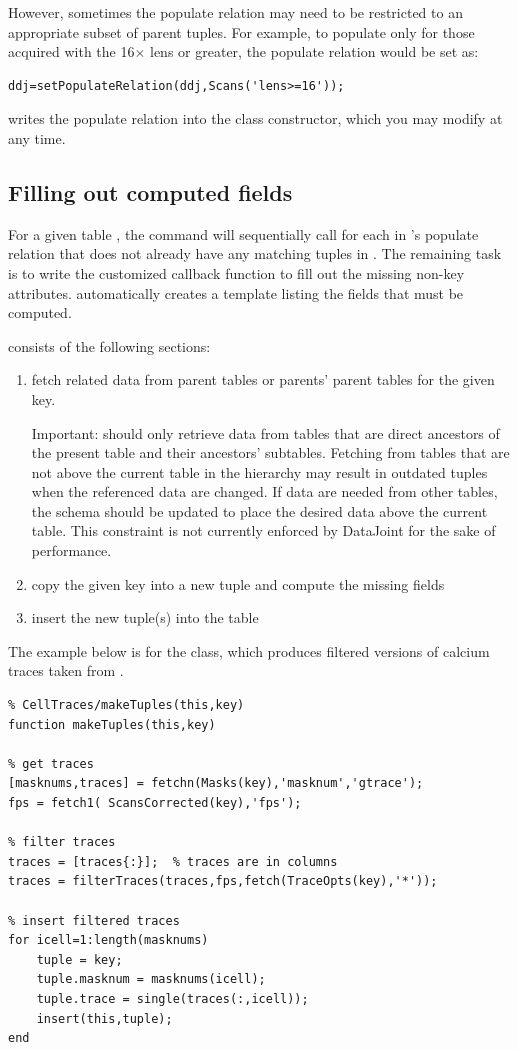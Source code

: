 \documentclass[10pt]{article}
\begin{document}
However, sometimes the populate relation may need to be restricted to an appropriate subset of parent tuples. For example, to populate  only for those  acquired with the 16$\times$ lens or greater, the populate relation would be set as:
\begin{lstlisting}
ddj=setPopulateRelation(ddj,Scans('lens>=16'));
\end{lstlisting}

 writes the populate relation into the class constructor, which you may modify at any time.

\subsection{Filling out computed fields}
For a given table , the command   will sequentially call  for each  in 's populate relation that does not already have any matching tuples in .  The remaining task is to write the customized  callback function to fill out the missing non-key attributes.  automatically creates a template  listing the fields that must be computed. 

 consists of the following sections:
\begin{enumerate}
\item fetch related data from parent tables or parents' parent tables for the given key.  

{\color{red}Important:}  should only retrieve data from tables that are direct ancestors of the present table and their ancestors' subtables. Fetching from tables that are not above the current table in the hierarchy may result in outdated tuples when the referenced data are changed. If data are needed from other tables, the schema should be updated to place the desired data above the current table.  This constraint is not currently enforced by DataJoint for the sake of performance. 
\item copy the given key into a new tuple and compute the missing fields
\item insert the new tuple(s) into the table
\end{enumerate}

The example below is for the  class, which produces filtered versions of calcium traces taken from .
\begin{lstlisting}
% CellTraces/makeTuples(this,key) 
function makeTuples(this,key)

% get traces 
[masknums,traces] = fetchn(Masks(key),'masknum','gtrace');
fps = fetch1( ScansCorrected(key),'fps');

% filter traces
traces = [traces{:}];  % traces are in columns
traces = filterTraces(traces,fps,fetch(TraceOpts(key),'*'));

% insert filtered traces 
for icell=1:length(masknums)
    tuple = key;
    tuple.masknum = masknums(icell);
    tuple.trace = single(traces(:,icell));
    insert(this,tuple);
end
\end{lstlisting}
\end{document}
